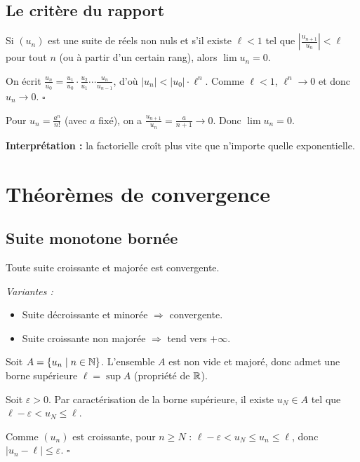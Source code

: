 \subsection{Le critère du rapport}

\begin{thmbox}
Si $(u_n)$ est une suite de réels non nuls et s'il existe $\ell < 1$ tel que $\left|\frac{u_{n+1}}{u_n}\right| < \ell$ pour tout $n$ (ou à partir d'un certain rang), alors $\lim u_n = 0$.
\end{thmbox}

\begin{proofbox}
On écrit $\frac{u_n}{u_0} = \frac{u_1}{u_0} \cdot \frac{u_2}{u_1} \cdots \frac{u_n}{u_{n-1}}$, d'où $|u_n| < |u_0| \cdot \ell^n$. Comme $\ell < 1$, $\ell^n \to 0$ et donc $u_n \to 0$. \hfill$\square$
\end{proofbox}

\begin{exbox}[Application classique : $\lim \frac{a^n}{n!} = 0$]
Pour $u_n = \frac{a^n}{n!}$ (avec $a$ fixé), on a $\frac{u_{n+1}}{u_n} = \frac{a}{n+1} \to 0$. Donc $\lim u_n = 0$.

\textbf{Interprétation :} la factorielle croît plus vite que n'importe quelle exponentielle.
\end{exbox}


\section{Théorèmes de convergence}

\subsection{Suite monotone bornée}

\begin{thmbox}
Toute suite croissante et majorée est convergente.

\medskip
\textit{Variantes :}
\begin{itemize}[leftmargin=1cm]
  \item Suite décroissante et minorée $\Rightarrow$ convergente.
  \item Suite croissante non majorée $\Rightarrow$ tend vers $+\infty$.
\end{itemize}
\end{thmbox}

\begin{proofbox}
Soit $A = \{u_n \mid n \in \mathbb{N}\}$. L'ensemble $A$ est non vide et majoré, donc admet une borne supérieure $\ell = \sup A$ (propriété de $\mathbb{R}$).

Soit $\varepsilon > 0$. Par caractérisation de la borne supérieure, il existe $u_N \in A$ tel que $\ell - \varepsilon < u_N \leqslant \ell$.

Comme $(u_n)$ est croissante, pour $n \geqslant N$ : $\ell - \varepsilon < u_N \leqslant u_n \leqslant \ell$, donc $|u_n - \ell| \leqslant \varepsilon$. \hfill$\square$
\end{proofbox}

